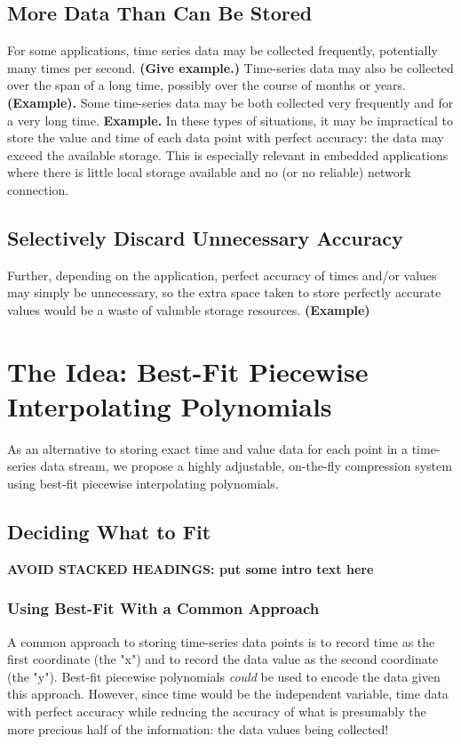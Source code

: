 \documentclass{article}
\begin{document}
\subsection{More Data Than Can Be Stored}
\label{subsec:practical_applications}
For some applications, time series data may be collected frequently, potentially many times per second. \textbf{(Give example.) } Time-series data may also be collected over the span of a long time, possibly over the course of months or years. \textbf{(Example). } Some time-series data may be both collected very frequently and for a very long time. \textbf{Example.} In these types of situations, it may be impractical to store the value and time of each data point with perfect accuracy: the data may exceed the available storage. This is especially relevant in embedded applications where there is little local storage available and no (or no reliable) network connection.

\subsection{Selectively Discard Unnecessary Accuracy}
\label{subsec:unnecessary_accuracy}
Further, depending on the application, perfect accuracy of times and/or values may simply be unnecessary, so the extra space taken to store perfectly accurate values would be a waste of valuable storage resources. \textbf{(Example)}

\section{The Idea: Best-Fit Piecewise Interpolating Polynomials}
\label{sec:the_idea}
As an alternative to storing exact time and value data for each point in a time-series data stream, we propose a highly adjustable, on-the-fly compression system using best-fit piecewise interpolating polynomials.

\subsection{Deciding What to Fit}
\textbf{AVOID STACKED HEADINGS: put some intro text here}
\subsubsection{Using Best-Fit With a Common Approach}
A common approach to storing time-series data points is to record time as the first coordinate (the "x") and to record the data value as the second coordinate (the "y"). Best-fit piecewise polynomials \textit{could} be used to encode the data given this approach. However, since time would be the independent variable, time data with perfect accuracy while reducing the accuracy of what is presumably the more precious half of the information: the data values being collected!
\end{document}
